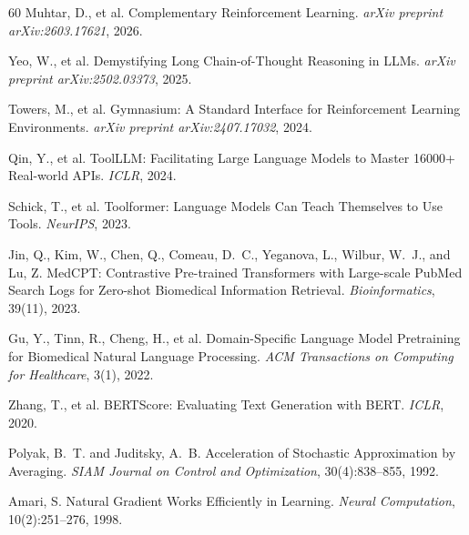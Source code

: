 \documentclass{article}
\begin{document}
\begin{thebibliography}{60}
Muhtar, D., et al.
\newblock Complementary Reinforcement Learning.
\newblock \emph{arXiv preprint arXiv:2603.17621}, 2026.


Yeo, W., et al.
\newblock Demystifying Long Chain-of-Thought Reasoning in LLMs.
\newblock \emph{arXiv preprint arXiv:2502.03373}, 2025.


Towers, M., et al.
\newblock Gymnasium: A Standard Interface for Reinforcement Learning Environments.
\newblock \emph{arXiv preprint arXiv:2407.17032}, 2024.

Qin, Y., et al.
\newblock ToolLLM: Facilitating Large Language Models to Master 16000+ Real-world APIs.
\newblock \emph{ICLR}, 2024.

Schick, T., et al.
\newblock Toolformer: Language Models Can Teach Themselves to Use Tools.
\newblock \emph{NeurIPS}, 2023.

Jin, Q., Kim, W., Chen, Q., Comeau, D.~C., Yeganova, L., Wilbur, W.~J., and Lu, Z.
\newblock MedCPT: Contrastive Pre-trained Transformers with Large-scale PubMed Search Logs for Zero-shot Biomedical Information Retrieval.
\newblock \emph{Bioinformatics}, 39(11), 2023.


Gu, Y., Tinn, R., Cheng, H., et al.
\newblock Domain-Specific Language Model Pretraining for Biomedical Natural Language Processing.
\newblock \emph{ACM Transactions on Computing for Healthcare}, 3(1), 2022.

Zhang, T., et al.
\newblock BERTScore: Evaluating Text Generation with BERT.
\newblock \emph{ICLR}, 2020.


Polyak, B.~T. and Juditsky, A.~B.
\newblock Acceleration of Stochastic Approximation by Averaging.
\newblock \emph{SIAM Journal on Control and Optimization}, 30(4):838--855, 1992.

Amari, S.
\newblock Natural Gradient Works Efficiently in Learning.
\newblock \emph{Neural Computation}, 10(2):251--276, 1998.


\end{thebibliography}
\end{document}
